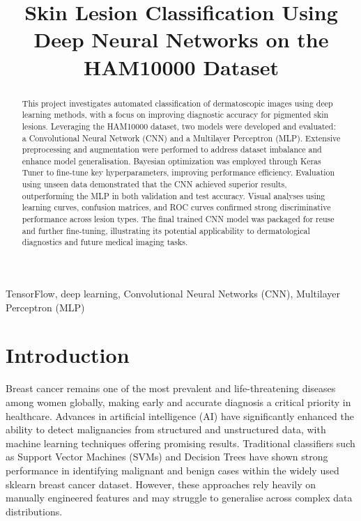 \documentclass[conference]{IEEEtran}
\begin{document}
	
	\title{Skin Lesion Classification Using Deep Neural Networks on the HAM10000 Dataset\\
		
	}
	
	\author{
}
	
	\maketitle
	
	\begin{abstract}
		This project investigates automated classification of dermatoscopic images using deep learning methods, with a focus on improving diagnostic accuracy for pigmented skin lesions. Leveraging the HAM10000 dataset, two models were developed and evaluated: a Convolutional Neural Network (CNN) and a Multilayer Perceptron (MLP). Extensive preprocessing and augmentation were performed to address dataset imbalance and enhance model generalisation. Bayesian optimization was employed through Keras Tuner to fine-tune key hyperparameters, improving performance efficiency. Evaluation using unseen data demonstrated that the CNN achieved superior results, outperforming the MLP in both validation and test accuracy. Visual analyses using learning curves, confusion matrices, and ROC curves confirmed strong discriminative performance across lesion types. The final trained CNN model was packaged for reuse and further fine-tuning, illustrating its potential applicability to dermatological diagnostics and future medical imaging tasks.\\
	\end{abstract}
	
	\begin{IEEEkeywords}
		TensorFlow, deep learning, Convolutional Neural Networks (CNN), Multilayer Perceptron (MLP)
	\end{IEEEkeywords}
	
	\section{Introduction}
	Breast cancer remains one of the most prevalent and life-threatening diseases among women globally, making early and accurate diagnosis a critical priority in healthcare. Advances in artificial intelligence (AI) have significantly enhanced the ability to detect malignancies from structured and unstructured data, with machine learning techniques offering promising results. Traditional classifiers such as Support Vector Machines (SVMs) and Decision Trees have shown strong performance in identifying malignant and benign cases within the widely used sklearn breast cancer dataset. However, these approaches rely heavily on manually engineered features and may struggle to generalise across complex data distributions.
	
\end{document}
